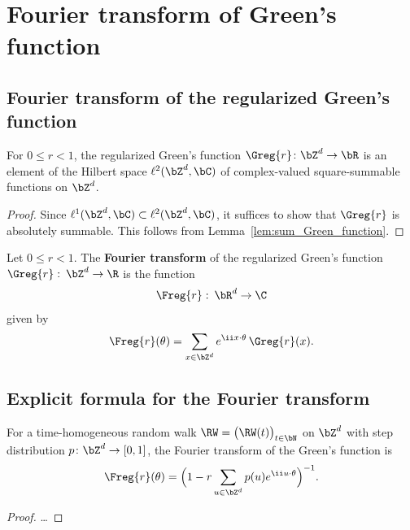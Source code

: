 \chapter{Fourier transform of Green's function}

\section{Fourier transform of the regularized Green's function}

\begin{lemma}
  \label{lem:regularized_Green_square_summable}
  \leanok %
  For $0 \le r < 1$,
  the regularized Green's function $\Greg{r} \colon \bZ^d \to \bR$ is
  an element of the Hilbert space $\ell^2(\bZ^d, \bC)$ of complex-valued
  square-summable functions on $\bZ^d$.
\end{lemma}
\begin{proof}
  Since $\ell^1(\bZ^d, \bC) \subset \ell^2(\bZ^d, \bC)$, it suffices to show
  that $\Greg{r}$ is absolutely summable.
  This follows from Lemma~\ref{lem:sum_Green_function}.
\end{proof}

\begin{definition}
  \label{def:Green_Fourier_transf}
  \leanok %
  Let $0 \le r < 1$.
  The \textbf{Fourier transform} of the regularized Green's function
  $\Greg{r} \, \colon \, \bZ^d \to \R$
  is the function
  \begin{align*}
  \Freg{r} \, \colon \, \bR^d \to \C
  \end{align*}
  given by
  \begin{align*}
  \Freg{r} (\theta) = \sum_{x \in \bZ^d} e^{\ii x \cdot \theta} \, \Greg{r}(x) .
  \end{align*}
\end{definition}

\section{Explicit formula for the Fourier transform}

\begin{lemma}
  \label{lem:Markovian_Green_Fourier}
  For a time-homogeneous random walk $\RW = \big(\RW(t)\big)_{t \in \bN}$ on $\bZ^d$
  with step distribution $p \colon \bZ^d \to [0,1]$,
  the Fourier transform of the Green's function is
  \begin{align*}
  \Freg{r} (\theta) = \Big(1 - r \sum_{u\in \bZ^d} p(u) e^{\ii u \cdot \theta}\Big)^{-1} .
  \end{align*}
\end{lemma}
\begin{proof}
\ldots
\end{proof}

